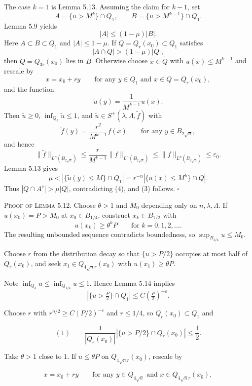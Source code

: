 The case $k=1$ is Lemma 5.13. Assuming the claim for $k-1$, set
\[
A=\{u>M^k\}\cap Q_1,\qquad B=\{u>M^{k-1}\}\cap Q_1.
\]
Lemma 5.9 yields
\begin{equation}\tag{3}
|A|\leq (1-\mu)|B|.
\end{equation}
Here $A\subset B\subset Q_1$ and $|A|\le1-\mu$. If $Q=Q_r(x_0)\subset Q_1$ satisfies
\begin{equation}\tag{4}
|A\cap Q|>(1-\mu)|Q|,
\end{equation}
then $\tilde Q=Q_{3r}(x_0)$ lies in $B$. Otherwise choose $\tilde x\in\tilde Q$ with $u(\tilde x)\le M^{k-1}$ and rescale by
\[
x=x_0+ry \qquad \text{for any } y\in Q_1 \text{ and } x\in Q=Q_r(x_0),
\]
and the function
\[
\tilde{u}(y)=\frac{1}{M^{k-1}}u(x).
\]
Then $\tilde u\ge0$, $\inf_{Q_3}\tilde u\le1$, and $\tilde u\in S^+(\lambda,\Lambda,\tilde f)$ with
\[
\tilde{f}(y)=\frac{r^2}{M^{k-1}}f(x) \qquad \text{for any } y\in B_{2\sqrt{n}},
\]
and hence
\[
\|\tilde{f}\|_{L^n(B_{2\sqrt{n}})}
\leq \frac{r}{M^{k-1}}\|f\|_{L^n(B_{2\sqrt{n}})}
\leq \|f\|_{L^n(B_{2\sqrt{n}})}\leq \varepsilon_0.
\]
Lemma 5.13 gives
\[
\mu<\left|\{\tilde{u}(y)\leq M\}\cap Q_1\right|=r^{-n}\left|\{u(x)\leq M^k\}\cap Q\right|.
\]
Thus $|Q\cap A^c|>\mu|Q|$, contradicting (4), and (3) follows.
\hfill$\square$

\textsc{Proof of Lemma 5.12.} \sketch Choose $\theta>1$ and $M_0$ depending only on $n,\lambda,\Lambda$. If $u(x_0)=P>M_0$ at $x_0\in B_{1/4}$, construct $x_k\in B_{1/2}$ with
\[
u(x_k)\geq \theta^k P \qquad \text{for } k=0,1,2,\ldots.
\]
The resulting unbounded sequence contradicts boundedness, so $\sup_{B_{1/4}}u\le M_0$.

Choose $r$ from the distribution decay so that $\{u>P/2\}$ occupies at most half of $Q_r(x_0)$, and seek $x_1\in Q_{4\sqrt n r}(x_0)$ with $u(x_1)\ge\theta P$.

Note $\inf_{Q_3}u\leq \inf_{Q_{1/4}}u\leq 1$. Hence Lemma 5.14 implies
\[
|\{u>\tfrac{P}{2}\}\cap Q_1|\leq C\left(\tfrac{P}{2}\right)^{-\varepsilon}.
\]

Choose $r$ with $r^{n/2}\ge C(P/2)^{-\varepsilon}$ and $r\le1/4$, so $Q_r(x_0)\subset Q_1$ and

\[
(1)\qquad \frac{1}{|Q_r(x_0)|}|\{u > P/2\}\cap Q_r(x_0)| \le \frac{1}{2}.
\]

Take $\theta>1$ close to $1$. If $u\le\theta P$ on $Q_{4\sqrt n r}(x_0)$, rescale by

\[
x = x_0 + ry \qquad \text{for any } y \in Q_{4\sqrt{n}} \text{ and } x \in Q_{4\sqrt{n}r}(x_0),
\]


